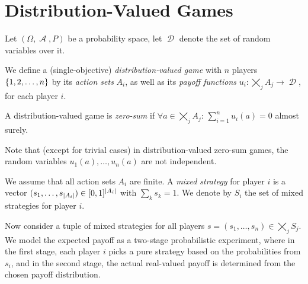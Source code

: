 \documentclass[a4paper]{scrreprt}
\DeclareMathOperator{\A}{\mathcal{A}}
\DeclareMathOperator{\leqtail}{\leq_{\text{tail}}}
\DeclareMathOperator{\RVs}{\mathcal{D}}
\DeclareMathOperator{\B}{\mathcal{B}}
\begin{document}
    
    
    \setcounter{chapter}{4}
    \setcounter{section}{1}
    \section{Distribution-Valued Games}
    \label{sec:dist-val-games}
    Let $(\Omega, \A, P)$ be a probability space, let $\RVs$ denote the set of random variables over it.
    \begin{defn}
        We define a (single-objective) \emph{distribution-valued game} with $n$ players $\{1,2,\dots,n\}$ by its \emph{action sets} $A_i$, as well as its \emph{payoff functions} $u_i: \bigtimes_j A_j \to \RVs$, for each player $i$.
    \end{defn}

    \begin{defn}
        A distribution-valued game is \emph{zero-sum} if $\forall a \in \bigtimes_j A_j$: $\sum_{i=1}^n u_i(a) = 0$ almost surely.
    \end{defn}

    Note that (except for trivial cases) in distribution-valued zero-sum games, the random variables $u_1(a), \dots, u_n(a)$ are not independent.
    
    \begin{defn}
        We assume that all action sets $A_i$ are finite. %
        A \emph{mixed strategy} for player $i$ is a vector $(s_1,\dots,s_{\left| A_i \right|}) \in [0, 1]^{\left| A_i \right|}$ with $\sum_k s_k = 1$.
        We denote by $S_i$ the set of mixed strategies for player $i$.
    \end{defn}

    
    
    Now consider a tuple of mixed strategies for all players $s = (s_1, \dots, s_n) \in \bigtimes_j S_j$.
    We model the expected payoff as a two-stage probabilistic experiment, where in the first stage, each player $i$ picks a pure strategy based on the probabilities from $s_i$, and in the second stage, the actual real-valued payoff is determined from the chosen payoff distribution.
\end{document}
